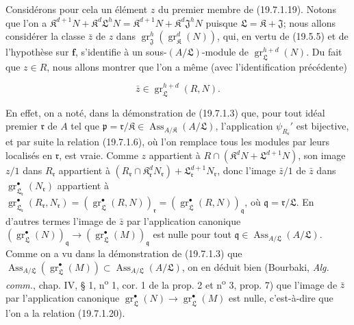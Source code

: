 Considérons pour cela un élément $z$ du premier membre de (19.7.1.19). Notons que l'on a $\mathfrak K^{d+1}N+\mathfrak K^d\mathfrak L^hN=\mathfrak K^{d+1}N+\mathfrak K^d\mathfrak J^hN$ puisque $\mathfrak L=\mathfrak K+\mathfrak J$; nous allons considérer la classe $\bar z$ de $z$ dans $\operatorname{gr}_{\mathfrak J}^h(\operatorname{gr}_{\mathfrak K}^d(N))$, qui, en vertu de (19.5.5) et de l'hypothèse sur $\mathbf f$, s'identifie à un sous-$(A/\mathfrak L)$-module de $\operatorname{gr}_{\mathfrak L}^{h+d}(N)$. Du fait que $z\in R$, nous allons montrer que l'on a même (avec l'identification précédente)
\begin{env}[19.7.1.20]
\label{IV.19.7.1.20}
\[
  \bar z\in\operatorname{gr}_{\mathfrak L}^{h+d}(R,N).
\]
\end{env}

En effet, on a noté, dans la démonstration de (19.7.1.3) que, pour tout idéal premier $\mathfrak r$ de $A$ tel que $\mathfrak p=\mathfrak r/\mathfrak K\in\operatorname{Ass}_{A/\mathfrak K}(A/\mathfrak L)$, l'application $\psi_{R_{\mathfrak r}}'$ est bijective, et par suite la relation (19.7.1.6), où l'on remplace tous les modules par leurs localisés en $\mathfrak r$, est vraie. Comme $z$ appartient à $R\cap(\mathfrak K^dN+\mathfrak L^{d+1}N)$, son image $z/1$ dans $R_{\mathfrak r}$ appartient à $(R_{\mathfrak r}\cap\mathfrak K_{\mathfrak r}^dN_{\mathfrak r})+\mathfrak L_{\mathfrak r}^{d+1}N_{\mathfrak r}$, donc l'image $\bar z/1$ de $\bar z$ dans $\operatorname{gr}_{\mathfrak L_{\mathfrak r}}^\bullet(N_{\mathfrak r})$ appartient à $\operatorname{gr}_{\mathfrak L_{\mathfrak r}}^\bullet(R_{\mathfrak r},N_{\mathfrak r})=(\operatorname{gr}_{\mathfrak L}^\bullet(R,N))_{\mathfrak r}=(\operatorname{gr}_{\mathfrak L}^\bullet(R,N))_{\mathfrak q}$, où $\mathfrak q=\mathfrak r/\mathfrak L$. En d'autres termes l'image de $\bar z$ par l'application canonique $(\operatorname{gr}_{\mathfrak L}^\bullet(N))_{\mathfrak q}\longrightarrow(\operatorname{gr}_{\mathfrak L}^\bullet(M))_{\mathfrak q}$ est nulle pour tout $\mathfrak q\in\operatorname{Ass}_{A/\mathfrak L}(A/\mathfrak L)$. Comme on a vu dans la démonstration de (19.7.1.3) que $\operatorname{Ass}_{A/\mathfrak L}(\operatorname{gr}_{\mathfrak L}^\bullet(M))\subset\operatorname{Ass}_{A/\mathfrak L}(A/\mathfrak L)$, on en déduit bien (Bourbaki, \emph{Alg. comm.}, chap. IV, § 1, n\textsuperscript{o} 1, cor. 1 de la prop. 2 et n\textsuperscript{o} 3, prop. 7) que l'image de $\bar z$ par l'application canonique $\operatorname{gr}_{\mathfrak L}^\bullet(N)\to\operatorname{gr}_{\mathfrak L}^\bullet(M)$ est nulle, c'est-à-dire que l'on a la relation (19.7.1.20).

